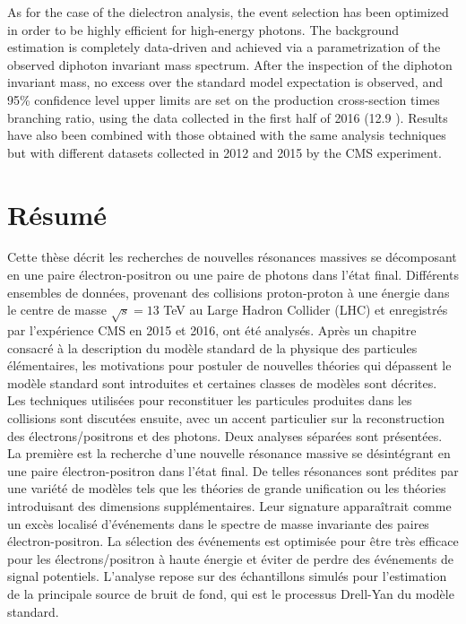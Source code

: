 As for the case of the dielectron analysis, the event selection has been optimized in order to be highly efficient for high-energy photons.
The background estimation is completely data-driven and achieved via a parametrization of the observed diphoton invariant mass spectrum.
After the inspection of the diphoton invariant mass, no excess over the standard model expectation is observed, and 95\% confidence
level upper limits are set on the production cross-section times branching ratio, using the data collected in the first half of 2016 (12.9 \fbinv). Results have also been combined with those obtained with the same analysis techniques but with different datasets collected in 2012 and 2015 by the CMS experiment.

\newpage
{}
\section*{Résumé}
Cette thèse décrit les recherches de nouvelles résonances massives se décomposant en une paire électron-positron ou une paire de photons dans l'état final.
Différents ensembles de données, provenant des collisions proton-proton à une énergie dans le centre de masse $\sqrt{s} = 13$ TeV
au Large Hadron Collider (LHC) et enregistrés par l'expérience CMS en 2015 et 2016, ont été analysés.
Après un chapitre consacré à la description du modèle standard de la physique des particules élémentaires,
les motivations pour postuler de nouvelles théories qui dépassent le modèle standard sont introduites
et certaines classes de modèles sont décrites. Les techniques utilisées pour reconstituer les particules
produites dans les collisions sont discutées ensuite, avec un accent particulier sur la reconstruction des électrons/positrons et des photons. Deux analyses séparées sont présentées.
\\La première est la recherche d'une nouvelle résonance massive se désintégrant en une paire électron-positron dans l'état final. De telles résonances
sont prédites par une variété de modèles tels que les théories de grande unification ou les théories introduisant des
dimensions supplémentaires. Leur signature apparaîtrait comme un excès localisé d'événements dans le spectre de masse invariante des paires électron-positron.
La sélection des événements est optimisée pour être très efficace pour les électrons/positron à haute énergie et
éviter de perdre des événements de signal potentiels.
L'analyse repose sur des échantillons simulés pour l'estimation de la principale source de bruit de fond, qui est le processus Drell-Yan du modèle standard.
